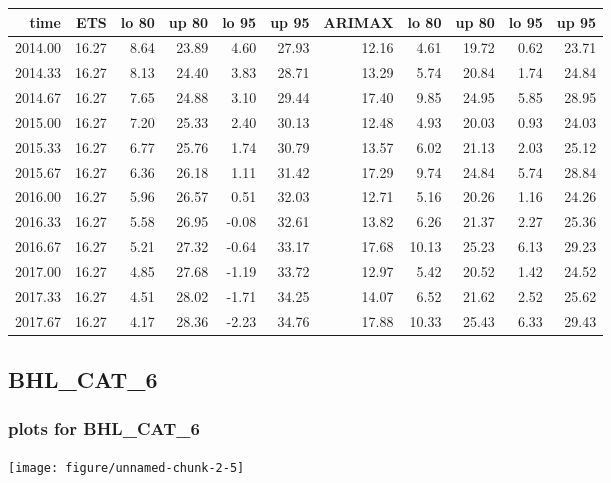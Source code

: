 \documentclass[10pt,a4paper]{article}\usepackage[]{graphicx}\usepackage[]{color}
\makeatletter
\def\maxwidth{ %
  \ifdim\Gin@nat@width>\linewidth
    \linewidth
  \else
    \Gin@nat@width
  \fi
}
\newcommand{\AaA}{\_}
\makeatother
\begin{document}
\begin{table}[ht]
\centering
\begin{tabular}{rrrrrrrrrrr}
  \hline
time & ETS  & lo 80 & up 80 & lo 95 & up 95 & ARIMAX  & lo 80 & up 80 & lo 95 & up 95 \\ 
  \hline
2014.00 & 16.27 & 8.64 & 23.89 & 4.60 & 27.93 & 12.16 & 4.61 & 19.72 & 0.62 & 23.71 \\ 
  2014.33 & 16.27 & 8.13 & 24.40 & 3.83 & 28.71 & 13.29 & 5.74 & 20.84 & 1.74 & 24.84 \\ 
  2014.67 & 16.27 & 7.65 & 24.88 & 3.10 & 29.44 & 17.40 & 9.85 & 24.95 & 5.85 & 28.95 \\ 
  2015.00 & 16.27 & 7.20 & 25.33 & 2.40 & 30.13 & 12.48 & 4.93 & 20.03 & 0.93 & 24.03 \\ 
  2015.33 & 16.27 & 6.77 & 25.76 & 1.74 & 30.79 & 13.57 & 6.02 & 21.13 & 2.03 & 25.12 \\ 
  2015.67 & 16.27 & 6.36 & 26.18 & 1.11 & 31.42 & 17.29 & 9.74 & 24.84 & 5.74 & 28.84 \\ 
  2016.00 & 16.27 & 5.96 & 26.57 & 0.51 & 32.03 & 12.71 & 5.16 & 20.26 & 1.16 & 24.26 \\ 
  2016.33 & 16.27 & 5.58 & 26.95 & -0.08 & 32.61 & 13.82 & 6.26 & 21.37 & 2.27 & 25.36 \\ 
  2016.67 & 16.27 & 5.21 & 27.32 & -0.64 & 33.17 & 17.68 & 10.13 & 25.23 & 6.13 & 29.23 \\ 
  2017.00 & 16.27 & 4.85 & 27.68 & -1.19 & 33.72 & 12.97 & 5.42 & 20.52 & 1.42 & 24.52 \\ 
  2017.33 & 16.27 & 4.51 & 28.02 & -1.71 & 34.25 & 14.07 & 6.52 & 21.62 & 2.52 & 25.62 \\ 
  2017.67 & 16.27 & 4.17 & 28.36 & -2.23 & 34.76 & 17.88 & 10.33 & 25.43 & 6.33 & 29.43 \\ 
   \hline
\end{tabular}
\end{table}

\newpage
\subsection{BHL\AaA CAT\AaA 6}
\subsubsection{plots for BHL\AaA CAT\AaA 6}

\texttt{[image: figure/unnamed-chunk-2-5]} 
\end{document}

